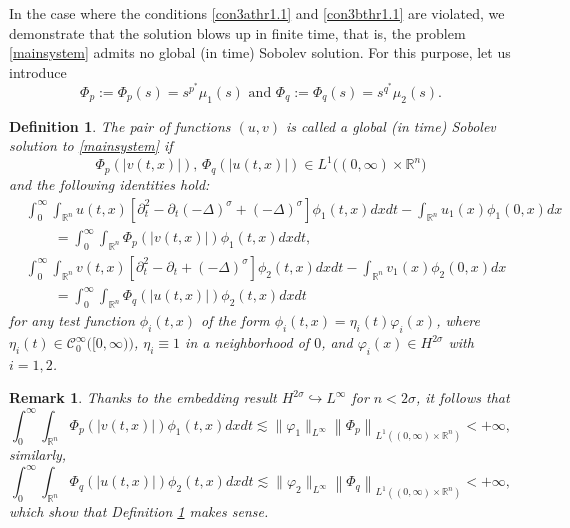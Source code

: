 \documentclass[11pt,reqno]{amsart}
\numberwithin{equation}{section}
\newtheorem{remark}{Remark}[section]
\newtheorem{definition}{Definition}[section]
\newcommand{\R}{\mathbb{R}}
\begin{document}
In the case where the conditions \eqref{con3athr1.1} and \eqref{con3bthr1.1} are violated, we demonstrate that the solution blows up in finite time, that is, the problem \eqref{mainsystem} admits no global (in time) Sobolev solution. For this purpose, let us introduce
\begin{equation}\label{critnonlinearity}
    \Phi_p:=\Phi_p(s)=s^{p^*} \mu_1(s) \text { and } \Phi_q:=\Phi_q(s)=s^{q^*} \mu_2(s).
\end{equation}
\begin{definition}\label{def_weaksolution}
 The pair of functions $(u,v)$ is called a global (in time) Sobolev solution to \eqref{mainsystem} if 
 \[
 \Phi_p(|v(t,x)|),\, \Phi_q(|u(t,x)|)\in L^1\big((0,\infty)\times \R^n\big)
 \]
 and the following identities hold:
    \[
    \begin{aligned}
    &\int_{0}^{\infty}\int_{\R^n}u(t,x)\left[\partial^2_t-\partial_t(-\Delta)^{\sigma}+(-\Delta)^{\sigma}\right]\phi_1(t,x)dxdt-\int_{\mathbb{R}^n}u_1(x)\phi_1(0,x)dx\\
    &\qquad=\int_{0}^{\infty}\int_{\R^n}\Phi_{p}(|v(t,x)|)\phi_1(t,x)dxdt, \\
    &\int_{0}^{\infty}\int_{\R^n}v(t,x)\left[\partial^2_t-\partial_t+(-\Delta)^{\sigma}\right]\phi_2(t,x)dxdt-\int_{\mathbb{R}^n}v_1(x)\phi_2(0,x)dx\\
    &\qquad =\int_{0}^{\infty}\int_{\R^n}\Phi_q(|u(t,x)|)\phi_2(t,x)dxdt 
\end{aligned}
    \]
    for any test function $\phi_{i}(t,x)$ of the form $\phi_{i}(t,x)=\eta_i(t)\varphi_{i}(x)$, where $\eta_i(t) \in \mathcal{C}^{\infty}_0\big([0,\infty)\big)$, $\eta_i\equiv 1$ in a neighborhood of $0$, and $\varphi_{i}(x)\in H^{2\sigma}$ with $i=1,2$.
\end{definition}
\begin{remark}
{\rm
     Thanks to the embedding result $H^{2\sigma}\hookrightarrow L^{\infty}$ for $n<2\sigma$, it follows that
    \[
    \int_{0}^{\infty}\int_{\R^n}\Phi_p(|v(t,x)|)\phi_1(t,x)dxdt \lesssim \|\varphi_1\|_{L^{\infty}}\left\|\Phi_p\right\|_{L^1((0,\infty)\times \R^n)}<+\infty,
    \]
    similarly,
    \[
    \int_{0}^{\infty}\int_{\R^n}\Phi_q(|u(t,x)|)\phi_2(t,x)dxdt \lesssim \|\varphi_2\|_{L^{\infty}}\left\|\Phi_q\right\|_{L^1((0,\infty)\times \R^n)}<+\infty,
    \]
    which show that Definition \ref{def_weaksolution} makes sense.
}
\end{remark}
\end{document}
